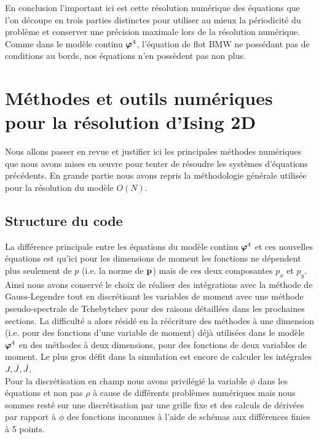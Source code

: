 \documentclass[10.5pt]{article}
\begin{document}
\begin{multicols}{2}
En conclusion l'important ici est cette résolution numérique des équations que l'on découpe en trois parties distinctes pour utiliser au mieux la périodicité du problème et conserver une précision maximale lors de la résolution numérique. Comme dans le modèle continu $\boldsymbol{ \varphi}^4$, l'équation de flot BMW  ne possédant pas de conditions au bords, nos équations n'en possèdent pas non plus.

\vspace*{11pt}

\section{Méthodes et outils numériques pour la résolution d'Ising 2D}

\label{sec:NumIsing}
Nous allons passer en revue et justifier ici les principales méthodes numériques que nous avons mises en œuvre pour tenter de résoudre les systèmes d'équations précédents. En grande partie nous avons repris la méthodologie générale utilisée pour la résolution du modèle $O(N)$.


\subsection{Structure du code}

La différence principale entre les équations du modèle continu $\boldsymbol{ \varphi}^4$ et ces nouvelles équations est qu'ici pour les dimensions de moment les fonctions ne dépendent plus seulement de $p$ (i.e. la norme de ${\bf p}$) mais de ces deux composantes $p_x$ et $p_y$. Ainsi nous avons conservé le choix de réaliser des intégrations avec la méthode de Gauss-Legendre tout en discrétisant les variables de moment avec une méthode pseudo-spectrale de Tchebytchev pour des raisons détaillées dans les prochaines sections. La difficulté a alors résidé en la réécriture des méthodes à une dimension (i.e. pour des fonctions d'une variable de moment) déjà utilisées dans le modèle $ \boldsymbol{ \varphi}^4$ en des méthodes à deux dimensions, pour des fonctions de deux variables de moment. Le plus gros défit dans la simulation est encore de calculer les intégrales $J, \bar{J}, \tilde{J}$. \\

Pour la discrétisation en champ nous avons privilégié la variable $\phi$ dans les équations et non pas $\rho$ à cause de différents problèmes numériques mais nous sommes resté sur une discrétisation par une grille fixe et des calculs de dérivées par rapport à $\phi$ des fonctions inconnues à l'aide de schémas aux différences finies à 5 points. \\



\end{multicols}
\end{document}
